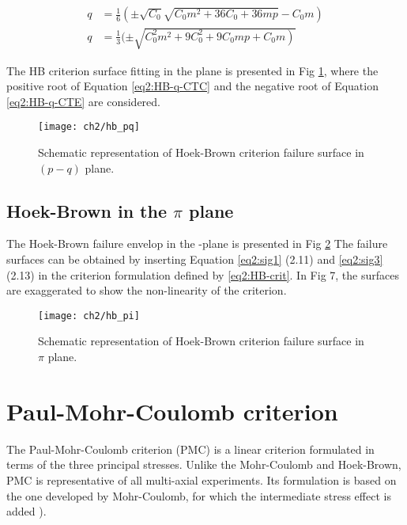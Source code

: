 \begin{align}
    q&=\frac{1}{6}\left(\pm \sqrt{C_{0}} \sqrt{C_{0} m^{2}+36 C_{0}+36 m p}-C_{0} m\right) \label{eq2:HB-q-CTC} \\
    q&=\frac{1}{3}(\pm \sqrt{\left.C_{0}^{2} m^{2}+9 C_{0}^{2}+9 C_{0} m p+C_{0} m\right)} \label{eq2:HB-q-CTE}
\end{align}

The HB criterion surface fitting in the  plane is presented in Fig \ref{fig2:hb_pq}, where the positive root of Equation \ref{eq2:HB-q-CTC} and the negative root of Equation \ref{eq2:HB-q-CTE} are considered.

\begin{figure}[tb]
    \centering
    \texttt{[image: ch2/hb\_pq]}
    \caption{Schematic representation of Hoek-Brown criterion failure surface in $(p-q)$ plane.}
    \label{fig2:hb_pq}
\end{figure} 

\subsection{Hoek-Brown in the \texorpdfstring{$\pi$}{pi} plane}\label{ch2:HB_pi}

The Hoek-Brown failure envelop in the -plane is presented in Fig \ref{fig2:hb_pi} The failure surfaces can be obtained by inserting Equation \ref{eq2:sig1} (2.11) and \ref{eq2:sig3}  (2.13) in the criterion formulation defined by \ref{eq2:HB-crit}. In Fig 7, the surfaces are exaggerated to show the non-linearity of the criterion.  

\begin{figure}[tb]
    \centering
    \texttt{[image: ch2/hb\_pi]}
    \caption{Schematic representation of Hoek-Brown criterion failure surface in $\pi$ plane.}
    \label{fig2:hb_pi}
\end{figure} 

\section{Paul-Mohr-Coulomb criterion}\label{ch2:PMC}

The Paul-Mohr-Coulomb criterion (PMC) is a linear criterion formulated in terms of the three principal stresses. Unlike the Mohr-Coulomb and Hoek-Brown, PMC is representative of all multi-axial experiments. Its formulation is based on the one developed by Mohr-Coulomb, for which the intermediate stress effect is added \cite[Paul (1968)]{Paul1968}). 

